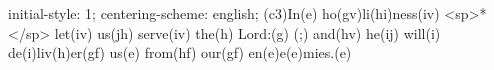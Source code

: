 initial-style: 1;
centering-scheme: english;
(c3)In(e) ho(gv)li(hi)ness(iv) <sp>*</sp> let(iv) us(jh) serve(iv) the(h) Lord:(g) (;) and(hv) he(ij) will(i) de(i)liv(h)er(gf) us(e) from(hf) our(gf) en(e)e(e)mies.(e)
